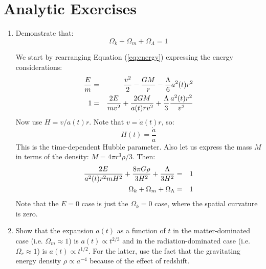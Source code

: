 \section{Analytic Exercises}

\begin{enumerate}
\item Demonstrate that:
\begin{equation}
\Omega_k + \Omega_m + \Omega_\Lambda = 1
\end{equation}
\begin{answer}
We start by rearranging Equation (\ref{eq:energy}) expressing the
energy considerations:
\begin{eqnarray}
\frac{E}{m} &=& \frac{v^2}{2}-\frac{GM}{r} - \frac{\Lambda}{6}a^2(t)r^2 \cr
1 &=& \frac{2E}{mv^2} + \frac{2GM}{a(t) rv^2} +
\frac{\Lambda}{3}\frac{a^2(t) r^2}{v^2} 
\end{eqnarray}
Now use $H=v/a(t)r$. Note that $v={\dot a}(t) r$, so:
\begin{equation}
H(t) = \frac{\dot a}{a}
\end{equation}
This is the time-dependent Hubble parameter. Also let us express the
mass $M$ in terms of the density: $M=4\pi r^3\rho/3$. Then:
\begin{eqnarray}
\frac{2E}{a^2(t) r^2 m H^2} + \frac{8\pi
  G\rho}{3H^2}+\frac{\Lambda}{3H^2} &=& 1 \cr 
\Omega_k + \Omega_m + \Omega_\Lambda &=& 1
\end{eqnarray}
Note that the $E=0$ case is just the $\Omega_k=0$ case, where the
spatial curvature is zero.
\end{answer}
\item Show that the expansion $a(t)$ as a function of $t$ in the
matter-dominated case (i.e. $\Omega_m \approx 1$) is $a(t)\propto t^{2/3}$ and in the radiation-dominated
case (i.e. $\Omega_r \approx 1$) is $a(t)\propto t^{1/2}$.
For the latter, use the fact that the gravitating energy density
$\rho \propto a^{-4}$ because of the effect of redshift.


\end{enumerate}
